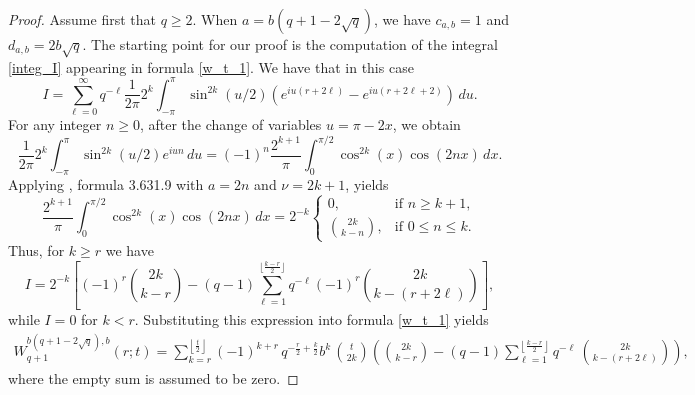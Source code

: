 \documentclass[12pt]{amsart}
\numberwithin{equation}{section}
\theoremstyle{boldremark}
\begin{document}
\begin{proof} Assume first that $q\geq 2$. 
When $a=b(q+1-2\sqrt{q})$, we have $c_{a,b}=1$ and $d_{a,b}=2b\sqrt{q}$. The starting point for our proof is the computation of the integral \eqref{integ_I} appearing in formula \eqref{w_t_1}. We have that in this case
$$
I= \sum_{\ell=0}^{\infty} q^{-\ell} \frac{1}{2\pi}2^{k} \int_{-\pi}^{\pi}\sin^{2k}(u/2)  \left(e^{iu(r+2\ell)} - e^{iu(r+2\ell+2)} \right) \,du.
$$
For any integer $n\geq 0$, after the change of variables $u=\pi-2x$, we obtain
\begin{equation}\label{eq. sin int}
\frac{1}{2\pi}2^{k} \int_{-\pi}^{\pi}\sin^{2k}(u/2) e^{iun} \,du=(-1)^n \frac{2^{k+1}}{\pi}\int_{0}^{\pi/2}\cos^{2k}(x)\cos(2nx)\, dx.
\end{equation}
Applying \cite{GR}, formula 3.631.9 with $a=2n$ and $\nu=2k+1$, yields
\begin{equation}\label{eq. sin int eval}
\frac{2^{k+1}}{\pi}\int_{0}^{\pi/2}\cos^{2k}(x)\cos(2nx)\,dx
=
2^{-k}\left\{
\begin{array}{ll}
0, & \text{if } n\geq k+1,\\[4pt]
\binom{2k}{k-n}, & \text{if } 0\leq n\leq k.
\end{array}
\right.
\end{equation}
Thus, for $k\geq r$ we have
$$
I=2^{-k}\left[(-1)^r\binom{2k}{k-r}-(q-1)\sum_{\ell=1}^{\lfloor\frac{k-r}{2}\rfloor}q^{-\ell}(-1)^r
\binom{2k}{k-(r+2\ell)}\right],
$$
while $I=0$ for $k<r$.
Substituting this expression into formula \eqref{w_t_1} yields
\begin{multline}\label{eq. W precomp}
W_{q+1}^{b(q+1-2\sqrt{q}),b}(r;t)
=
\sum_{k=r}^{\left\lfloor \frac{t}{2}\right\rfloor}
(-1)^{k+r}\,
q^{-\frac{r}{2}+\frac{k}{2}}b^k\,
\binom{t}{2k}
\left(
\binom{2k}{k-r}
-
(q-1)\sum_{\ell=1}^{\left\lfloor \frac{k-r}{2}\right\rfloor}
q^{-\ell}\,
\binom{2k}{k-(r+2\ell)}
\right),
\end{multline}
where the empty sum is assumed to be zero.


\end{proof}
\end{document}
